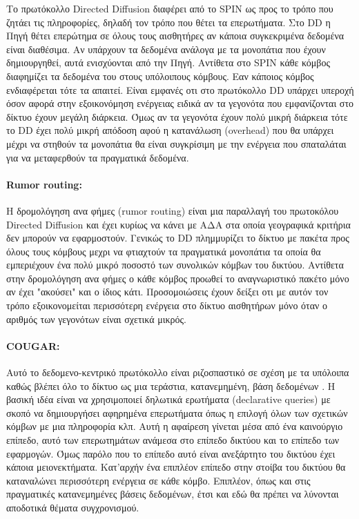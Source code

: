 Το πρωτόκολλο Directed Diffusion διαφέρει από το SPIN ως προς το τρόπο που ζητάει τις πληροφορίες, δηλαδή τον τρόπο που θέτει τα επερωτήματα. Στο DD η Πηγή θέτει
επερώτημα σε όλους τους αισθητήρες αν κάποια συγκεκριμένα δεδομένα είναι διαθέσιμα. Αν υπάρχουν τα δεδομένα ανάλογα με τα μονοπάτια που έχουν δημιουργηθεί, αυτά
ενισχύονται από την Πηγή. Αντίθετα στο SPIN κάθε κόμβος διαφημίζει τα δεδομένα του στους υπόλοιπους κόμβους. Εαν κάποιος κόμβος ενδιαφέρεται τότε τα απαιτεί. Είναι
εμφανές οτι στο πρωτόκολλο DD υπάρχει υπεροχή όσον αφορά στην εξοικονόμηση ενέργειας ειδικά αν τα γεγονότα που εμφανίζονται στο δίκτυο έχουν μεγάλη διάρκεια. Όμως αν
τα γεγονότα έχουν πολύ μικρή διάρκεια τότε το DD έχει πολύ μικρή απόδοση αφού η κατανάλωση (overhead) που θα υπάρχει μέχρι να στηθούν τα μονοπάτια θα είναι
συγκρίσιμη με την ενέργεια που σπαταλάται για να μεταφερθούν τα πραγματικά δεδομένα.

\paragraph{Rumor routing:} Η δρομολόγηση ανα φήμες (rumor routing) \cite{rumor_routing} είναι μια παραλλαγή του πρωτοκόλου Directed Diffusion και έχει κυρίως να κάνει
με ΑΔΑ στα οποία γεογραφικά κριτήρια δεν μπορούν να εφαρμοστούν. Γενικώς το DD πλημμυρίζει το δίκτυο με πακέτα προς όλους τους κόμβους μεχρι να φτιαχτούν τα
πραγματικά μονοπάτια τα οποία θα εμπεριέχουν ένα πολύ μικρό ποσοστό των συνολικών κόμβων του δικτύου. Αντίθετα στην δρομολόγηση ανα φήμες ο κάθε κόμβος προωθεί το
αναγνωριστικό πακέτο μόνο αν έχει "ακούσει" και ο ίδιος κάτι. Προσομοιώσεις έχουν δείξει οτι με αυτόν τον τρόπο εξοικονομείται περισσότερη ενέργεια στο δίκτυο
αισθητήρων μόνο όταν ο αριθμός των γεγονότων είναι σχετικά μικρός.

\paragraph{COUGAR:} Αυτό το δεδομενο-κεντρικό πρωτόκολλο είναι ριζοσπαστικό σε σχέση με τα υπόλοιπα καθώς βλέπει όλο το δίκτυο ως μια τεράστια, κατανεμημένη, βάση
δεδομένων \cite{cougar_protocol}. Η βασική ιδέα είναι να χρησιμοποιεί δηλωτικά ερωτήματα (declarative queries) με σκοπό να δημιουργήσει αφηρημένα επερωτήματα όπως η
επιλογή όλων των σχετικών κόμβων με μια πληροφορία κλπ. Αυτή η αφαίρεση γίνεται μέσα από ένα καινούργιο επίπεδο, αυτό των επερωτημάτων ανάμεσα στο επίπεδο δικτύου και
το επίπεδο των εφαρμογών. Όμως παρόλο που το επίπεδο αυτό είναι ανεξάρτητο του δικτύου έχει κάποια μειονεκτήματα. Κατ'αρχήν ένα επιπλέον επίπεδο στην στοίβα του
δικτύου θα καταναλώνει περισσότερη ενέργεια σε κάθε κόμβο. Επιπλέον, όπως και στις πραγματικές κατανεμημένες βάσεις δεδομένων, έτσι και εδώ θα πρέπει να λύνονται
αποδοτικά θέματα συγχρονισμού.

